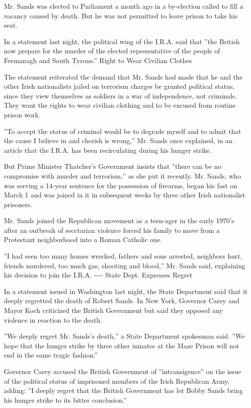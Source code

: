 Mr. Sands was elected to Parliament a month ago in a by-election called
to fill a vacancy caused by death. But he was not permitted to leave
prison to take his seat.

In a statement last night, the political wing of the I.R.A. said that
''the British now prepare for the murder of the elected representative
of the people of Fermanagh and South Tyrone.'' Right to Wear Civilian
Clothes

The statement reiterated the demand that Mr. Sands had made that he and
the other Irish nationalists jailed on terrorism charges be granted
political status, since they view themselves as soldiers in a war of
independence, not criminals. They want the rights to wear civilian
clothing and to be excused from routine prison work.

''To accept the status of criminal would be to degrade myself and to
admit that the cause I believe in and cherish is wrong,'' Mr. Sands once
explained, in an article that the I.R.A. has been recirculating during
his hunger strike.

But Prime Minister Thatcher's Government insists that ''there can be no
compromise with murder and terrorism,'' as she put it recently. Mr.
Sands, who was serving a 14-year sentence for the possession of
firearms, began his fast on March 1 and was joined in it in subsequent
weeks by three other Irish nationalist prisoners.

Mr. Sands joined the Republican movement as a teen-ager in the early
1970's after an outbreak of secctarian violence forced his family to
move from a Protestant neighborhood into a Roman Catholic one.

''I had seen too many homes wrecked, fathers and sons arrested,
neighbors hurt, friends murdered, too much gas, shooting and blood,''
Mr. Sands said, explaining his decision to join the I.R.A. -\/-\/-\/-
State Dept. Expresses Regret

In a statement issued in Washington last night, the State Department
said that it deeply regretted the death of Robert Sands. In New York,
Governor Carey and Mayor Koch criticized the British Government but said
they opposed any violence in reaction to the death.

''We deeply regret Mr. Sands's death,'' a State Department spokesman
said. ''We hope that the hunger strike by three other inmates at the
Maze Prison will not end in the same tragic fashion.''

Governor Carey accused the British Government of ''intransigence'' on
the issue of the political status of imprisoned members of the Irish
Republican Army, adding: ''I deeply regret that the British Government
has let Bobby Sands bring his hunger strike to its bitter conclusion.''

